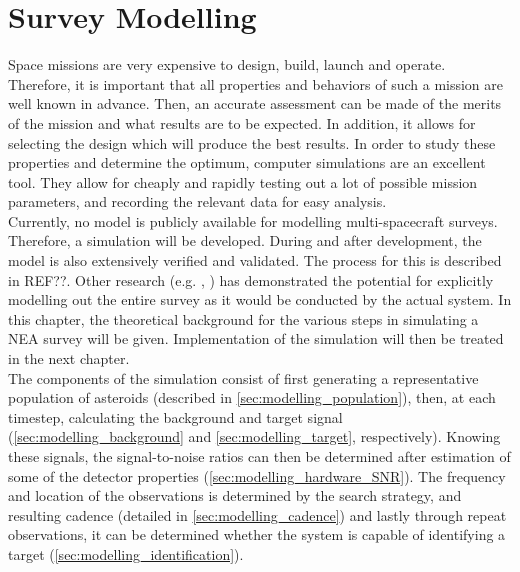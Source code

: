 \chapter{Survey Modelling}
\label{ch:surveymodelling}

Space missions are very expensive to design, build, launch and operate. Therefore, it is important that all properties and behaviors of such a mission are well known in advance. Then, an accurate assessment can be made of the merits of the mission and what results are to be expected. In addition, it allows for selecting the design which will produce the best results. In order to study these properties and determine the optimum, computer simulations are an excellent tool. They allow for cheaply and rapidly testing out a lot of possible mission parameters, and recording the relevant data for easy analysis. \\

Currently, no model is publicly available for modelling multi-spacecraft surveys. Therefore, a simulation will be developed. During and after development, the model is also extensively verified and validated. The process for this is described in REF??. Other research (e.g. \cite{Flyeye}, \cite{2017NEOSDT}) has demonstrated the potential for explicitly modelling out the entire survey as it would be conducted by the actual system. In this chapter, the theoretical background for the various steps in simulating a NEA survey will be given. Implementation of the simulation will then be treated in the next chapter.\\

The components of the simulation consist of first generating a representative population of asteroids (described in \autoref{sec:modelling_population}), then, at each timestep, calculating the background and target signal (\autoref{sec:modelling_background} and \autoref{sec:modelling_target}, respectively). Knowing these signals, the signal-to-noise ratios can then be determined after estimation of some of the detector properties (\autoref{sec:modelling_hardware_SNR}). The frequency and location of the observations is determined by the search strategy, and resulting cadence (detailed in \autoref{sec:modelling_cadence}) and lastly through repeat observations, it can be determined whether the system is capable of identifying a target (\autoref{sec:modelling_identification}).\\

